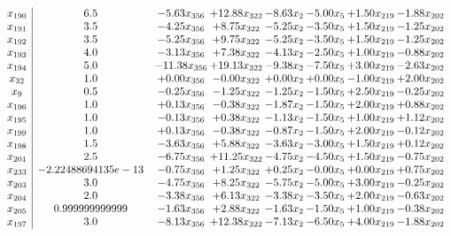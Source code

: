 \documentclass[8pt]{article}
\begin{document}
\[\begin{array}{c| c c@{\hskip 2pt} c@{\hskip 2pt} c@{\hskip 2pt} c@{\hskip 2pt} c@{\hskip 2pt} c@{\hskip 2pt} }
 x_{190}   &  6.5 & -5.63 x_{356} & + 12.88 x_{322} & -8.63 x_{2} & -5.00 x_{5} & +  1.50 x_{219} & -1.88 x_{202}\\
 x_{191}   &  3.5 & -4.25 x_{356} & +  8.75 x_{322} & -5.25 x_{2} & -3.50 x_{5} & +  1.50 x_{219} & -1.25 x_{202}\\
 x_{192}   &  3.5 & -5.25 x_{356} & +  9.75 x_{322} & -5.25 x_{2} & -3.50 x_{5} & +  1.50 x_{219} & -1.25 x_{202}\\
 x_{193}   &  4.0 & -3.13 x_{356} & +  7.38 x_{322} & -4.13 x_{2} & -2.50 x_{5} & +  1.00 x_{219} & -0.88 x_{202}\\
 x_{194}   &  5.0 & -11.38 x_{356} & + 19.13 x_{322} & -9.38 x_{2} & -7.50 x_{5} & +  3.00 x_{219} & -2.63 x_{202}\\
 x_{32}   &  1.0 & +  0.00 x_{356} & -0.00 x_{322} & +  0.00 x_{2} & +  0.00 x_{5} & -1.00 x_{219} & +  2.00 x_{202}\\
 x_{9}   &  0.5 & -0.25 x_{356} & -1.25 x_{322} & -1.25 x_{2} & -1.50 x_{5} & +  2.50 x_{219} & -0.25 x_{202}\\
 x_{196}   &  1.0 & +  0.13 x_{356} & -0.38 x_{322} & -1.87 x_{2} & -1.50 x_{5} & +  2.00 x_{219} & +  0.88 x_{202}\\
 x_{195}   &  1.0 & -0.13 x_{356} & +  0.38 x_{322} & -1.13 x_{2} & -1.50 x_{5} & +  1.00 x_{219} & +  1.12 x_{202}\\
 x_{199}   &  1.0 & +  0.13 x_{356} & -0.38 x_{322} & -0.87 x_{2} & -1.50 x_{5} & +  2.00 x_{219} & -0.12 x_{202}\\
 x_{198}   &  1.5 & -3.63 x_{356} & +  5.88 x_{322} & -3.63 x_{2} & -3.00 x_{5} & +  1.50 x_{219} & +  0.12 x_{202}\\
 x_{201}   &  2.5 & -6.75 x_{356} & + 11.25 x_{322} & -4.75 x_{2} & -4.50 x_{5} & +  1.50 x_{219} & -0.75 x_{202}\\
 x_{233}   &  -2.22488694135e-13 & -0.75 x_{356} & +  1.25 x_{322} & +  0.25 x_{2} & -0.00 x_{5} & +  0.00 x_{219} & +  0.75 x_{202}\\
 x_{203}   &  3.0 & -4.75 x_{356} & +  8.25 x_{322} & -5.75 x_{2} & -5.00 x_{5} & +  3.00 x_{219} & -0.25 x_{202}\\
 x_{204}   &  2.0 & -3.38 x_{356} & +  6.13 x_{322} & -3.38 x_{2} & -3.50 x_{5} & +  2.00 x_{219} & -0.63 x_{202}\\
 x_{205}   &  0.999999999999 & -1.63 x_{356} & +  2.88 x_{322} & -1.63 x_{2} & -1.50 x_{5} & +  1.00 x_{219} & -0.38 x_{202}\\
 x_{197}   &  3.0 & -8.13 x_{356} & + 12.38 x_{322} & -7.13 x_{2} & -6.50 x_{5} & +  4.00 x_{219} & -1.88 x_{202}\\

\end{array}\]
\end{document}
